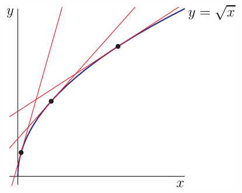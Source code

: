\begin{eg}
\begin{itemize}
\begin{efig}
 \begin{center}
 \includegraphics{tangentSqrt}
 \end{center}
\end{efig}

\end{itemize}

\end{eg}

